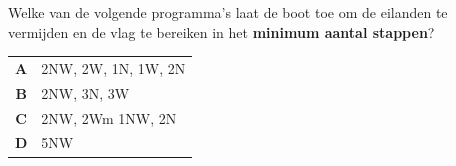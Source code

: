 \documentclass[12pt, a4paper]{article}
\begin{document}
\begin{minipage}{\textwidth}
			Welke van de volgende programma's laat de boot toe om de eilanden te vermijden en de vlag te bereiken in het \textbf{minimum aantal stappen}?
	
			\begin{table}[H]
				\centering
				\begin{tabular}{|c l|}
					\hline
					\textbf{A} &  2NW, 2W, 1N, 1W, 2N \\ 
					\textbf{B} &  2NW, 3N, 3W \\
					\textbf{C} &  2NW, 2Wm 1NW, 2N \\ 
					\textbf{D} &  5NW \\ 
					\hline
				\end{tabular}
			\end{table}
	\end{minipage} \\ \\
	
\end{document}
